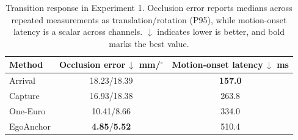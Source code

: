 \begin{table}[t]
\centering
\caption{Transition response in Experiment 1. Occlusion error reports medians across repeated measurements as translation/rotation (P95), while motion-onset latency is a scalar across channels. $\downarrow$ indicates lower is better, and bold marks the best value.}
\label{tab:exp1-transition}
\begin{tabular}{@{}lcc@{}}
\toprule
Method & \shortstack{Occlusion error\,$\downarrow$\\mm/$^\circ$} & \shortstack{Motion-onset latency\,$\downarrow$\\ms} \\
\midrule
Arrival & 18.23/18.39 & \textbf{157.0} \\
Capture & 16.93/18.38 & 263.8 \\
One-Euro & 10.41/8.66 & 334.0 \\
EgoAnchor & \textbf{4.85}/\textbf{5.52} & 510.4 \\
\bottomrule
\end{tabular}
\end{table}

